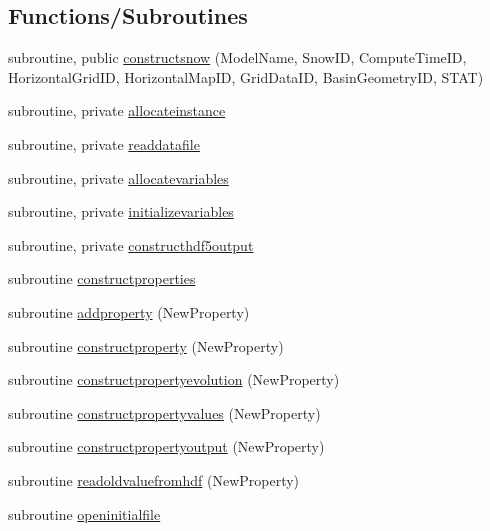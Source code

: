 \subsection*{Functions/\+Subroutines}
\begin{DoxyCompactItemize}
\item 
subroutine, public \mbox{\hyperlink{namespacemodulesnow_af7722587c67638fd4a4d05e998e957b0}{constructsnow}} (Model\+Name, Snow\+ID, Compute\+Time\+ID, Horizontal\+Grid\+ID, Horizontal\+Map\+ID, Grid\+Data\+ID, Basin\+Geometry\+ID, S\+T\+AT)
\item 
subroutine, private \mbox{\hyperlink{namespacemodulesnow_a752062220e47eb96c5b9ecdc75609c34}{allocateinstance}}
\item 
subroutine, private \mbox{\hyperlink{namespacemodulesnow_a6ca0e43e3af7be1542e8e61ec1d6d7b6}{readdatafile}}
\item 
subroutine, private \mbox{\hyperlink{namespacemodulesnow_a82db750ad87b4aa5ce786f1d63a4f901}{allocatevariables}}
\item 
subroutine, private \mbox{\hyperlink{namespacemodulesnow_a9e1c37918173cd2c259cbdae24b7e9bc}{initializevariables}}
\item 
subroutine, private \mbox{\hyperlink{namespacemodulesnow_a6d044212a6e9ba902389a391f8494f53}{constructhdf5output}}
\item 
subroutine \mbox{\hyperlink{namespacemodulesnow_a5906c8b8cc45f1a2cbb5a702d0d4aecc}{constructproperties}}
\item 
subroutine \mbox{\hyperlink{namespacemodulesnow_ab95e7de76c7c2b25d88721edc294e518}{addproperty}} (New\+Property)
\item 
subroutine \mbox{\hyperlink{namespacemodulesnow_a1ebff32e94c1fd5415eb41bb77f7b10a}{constructproperty}} (New\+Property)
\item 
subroutine \mbox{\hyperlink{namespacemodulesnow_ac9ddc053b9b4396306dc907dad5c1c95}{constructpropertyevolution}} (New\+Property)
\item 
subroutine \mbox{\hyperlink{namespacemodulesnow_a6599173ecfbf81367f1afdb4ac9a5c81}{constructpropertyvalues}} (New\+Property)
\item 
subroutine \mbox{\hyperlink{namespacemodulesnow_a70bdbf0fe6f049a855b8643892b060a2}{constructpropertyoutput}} (New\+Property)
\item 
subroutine \mbox{\hyperlink{namespacemodulesnow_af891ed4f018c66ced7868c95013229f2}{readoldvaluefromhdf}} (New\+Property)
\item 
subroutine \mbox{\hyperlink{namespacemodulesnow_a78835d47393c5328c084dddbc4457d6d}{openinitialfile}}

\end{DoxyCompactItemize}
